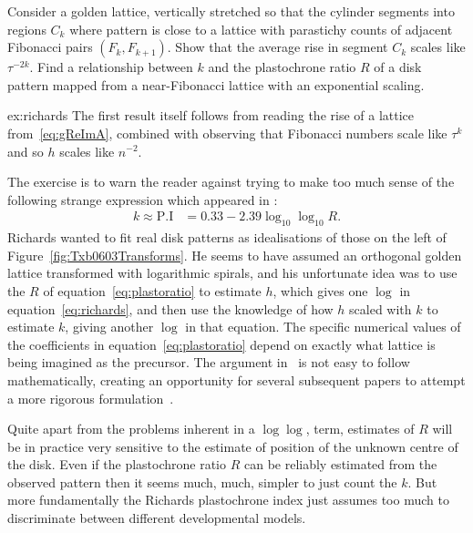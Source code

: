 \begin{jExercise}\label{ex:richards}
 Consider a golden lattice, vertically stretched so that the cylinder segments into regions $C_k$ where pattern is close to a lattice with parastichy counts of adjacent Fibonacci pairs $(F_k,F_{k+1})$.
	Show that the average rise in segment $C_k$ scales like $\tau^{-2k}$.
	Find a relationship between $k$ and the plastochrone ratio $R$ of a disk pattern mapped from a near-Fibonacci lattice with an exponential scaling.
\end{jExercise}
\begin{jAnswer}{ex:richards}
	The first result itself follows
	from reading the rise of a lattice from~\eqref{eq:gReImA}, combined with observing that Fibonacci numbers scale like $\tau^k$
	and so $h$ scales like $n^{-2}$. 
	
The exercise is to warn the reader against trying to make too much sense of the following strange expression which appeared in
	\autocite{richardsPhyllotaxisItsQuantitative1951}:
	\begin{align}
		k\approx \mbox{P.I} &= 0.33 - 2.39 \log_{10}  \log_{10} R.
		\label{eq:richards}
	\end{align}
	 Richards wanted to fit real disk patterns as idealisations of those on the left of Figure~\ref{fig:Txb0603Transforms}. He  
	 seems to have assumed an orthogonal golden lattice transformed with logarithmic spirals, and his unfortunate idea was to use the $R$ of equation~\eqref{eq:plastoratio} to estimate $h$, which gives one $\log$ in equation~\ref{eq:richards}, and then use the knowledge of how $h$ scaled with $k$ to estimate $k$, giving another $\log$ in that equation. The specific numerical values of the coefficients in equation~\eqref{eq:plastoratio} depend on exactly what lattice is being imagined as the precursor. The argument in~	\autocite{richardsPhyllotaxisItsQuantitative1951} is not easy to follow mathematically, creating an opportunity for several subsequent papers to attempt a more rigorous formulation~\autocite{thornleyPhyllotaxisIIDescription1975,jeanBib647,jeanBib278}.

Quite apart from the problems inherent in a $\log \log$, term, estimates of $R$ will be in practice very sensitive  to the estimate of position of the unknown centre of the disk. Even if the plastochrone ratio $R$ can be reliably estimated from the observed pattern then it seems much, much,  simpler to just count the $k$. But more fundamentally the Richards plastochrone index just assumes too much to discriminate between different developmental models.  

\end{jAnswer}


